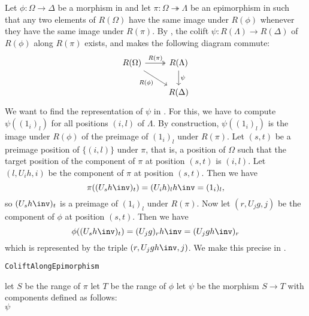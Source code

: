 \begin{rem}
Let $\phi\colon \Omega \to \Delta$ be a morphism in \SkeletalGSets{} and let $\pi\colon \Omega \twoheadrightarrow \Lambda$ be an epimorphism in \SkeletalGSets{} such that any two elements of $R(\Omega)$ have the same image under $R(\phi)$ whenever they have the same image under $R(\pi)$. By , the colift $\psi\colon R(\Lambda) \to R(\Delta)$ of $R(\phi)$ along $R(\pi)$ exists, and makes the following diagram commute:
\[
\begin{tikzcd}
R(\Omega) \arrow[r, "R(\pi)", two heads] \arrow[rd, "R(\phi)"'] & R(\Lambda) \arrow[d, "\psi"] \\
                                                       & R(\Delta)                   
\end{tikzcd}
\]
We want to find the representation of $\psi$ in \SkeletalGSets{}. For this, we have to compute $\psi((1_i)_l)$ for all positions $(i,l)$ of $\Lambda$. By construction, $\psi((1_i)_l)$ is the image under $R(\phi)$ of the preimage of $(1_i)_l$ under $R(\pi)$. Let $(s,t)$ be a preimage position of $\{(i,l)\}$ under $\pi$, that is, a position of $\Omega$ such that the target position of the component of $\pi$ at position $(s,t)$ is $(i,l)$. Let $(l,U_ih,i)$ be the component of $\pi$ at position $(s,t)$. Then we have \[\pi((U_sh\inv)_t) = (U_ih)_l h\inv = (1_i)_l,\] so $(U_sh\inv)_t$ is a preimage of $(1_i)_l$ under $R(\pi)$. Now let $(r,U_jg,j)$ be the component of $\phi$ at position $(s,t)$. Then we have \[\phi((U_sh\inv)_t) = (U_jg)_rh\inv = (U_jgh\inv)_r\] which is represented by the triple $(r,U_jgh\inv,j)$. We make this precise in .
\end{rem}

\begin{algorithm}\capstart
    \caption{\texttt{ColiftAlongEpimorphism}}\label{algo:ColiftAlongEpimorphism}
	\BlankLine
	let $S$ be the range of $\pi$\;
	let $T$ be the range of $\phi$\;
    \BlankLine
    let $\psi$ be the morphism $S \to T$ with components defined as follows:\\
	\BlankLine
	\Return $\psi$\;
\end{algorithm}

